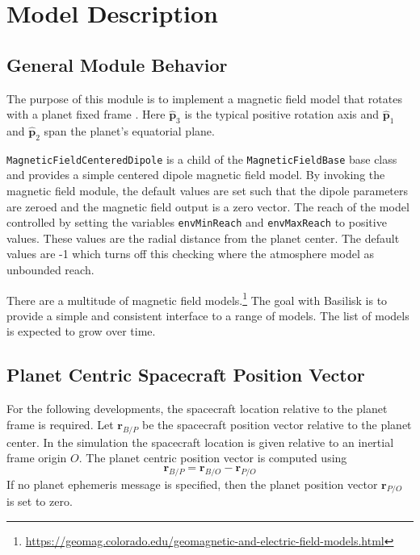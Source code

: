 
\section{Model Description}
\subsection{General Module Behavior}
The purpose of this module is to implement a magnetic field model that rotates with a planet fixed frame .  Here $\hat{\bm p}_{3}$ is the typical positive rotation axis and $\hat{\bm p}_{1}$ and $\hat{\bm p}_{2}$ span the planet's equatorial plane. 

{\tt MagneticFieldCenteredDipole} is a child of the {\tt MagneticFieldBase} base class and provides a simple centered dipole magnetic field model. 
By invoking the magnetic field module, the default values are set such that the dipole parameters are zeroed and the magnetic field output is a zero vector.
The reach of the model controlled by setting the variables {\tt envMinReach} and {\tt envMaxReach} to positive values.  These values are the radial distance from the planet center.  The default values are -1 which turns off this checking where the atmosphere model as unbounded reach.  

There are a multitude of magnetic field models.\footnote{\url { https://geomag.colorado.edu/geomagnetic-and-electric-field-models.html}} The goal with Basilisk is to provide a simple and consistent interface to a range of models.  The list of models is expected to grow over time.


\subsection{Planet Centric Spacecraft Position Vector}

For the following developments, the spacecraft location relative to the planet frame is required.  Let $\bm r_{B/P}$ be the spacecraft position vector relative to the planet center.  In the simulation the spacecraft location is given relative to an inertial frame origin $O$.  The planet centric position vector is computed using
\begin{equation}
	\bm r_{B/P} = \bm r_{B/O} - \bm r_{P/O}
\end{equation}
If no planet ephemeris message is specified, then the planet position vector $\bm r_{P/O}$ is set to zero.  

